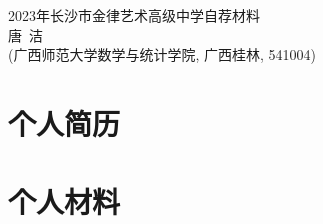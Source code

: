 \documentclass[UFT8]{ctexart}%
\begin{document}
\thispagestyle{empty} %
\vspace*{3cm}
\begin{center}
{{\LARGE\heiti 2023年长沙市金律艺术高级中学自荐材料}\\[0.6cm]
{\normalsize 唐\ 洁}\\[0.1cm]
{\small(广西师范大学数学与统计学院, 广西桂林, 541004)}}
\end{center}

\clearpage%
\tableofcontents%
\thispagestyle{empty} %

\clearpage%
\setcounter{page}{1}%

%
%

\section{个人简历}


\section{个人材料}
\end{document}
